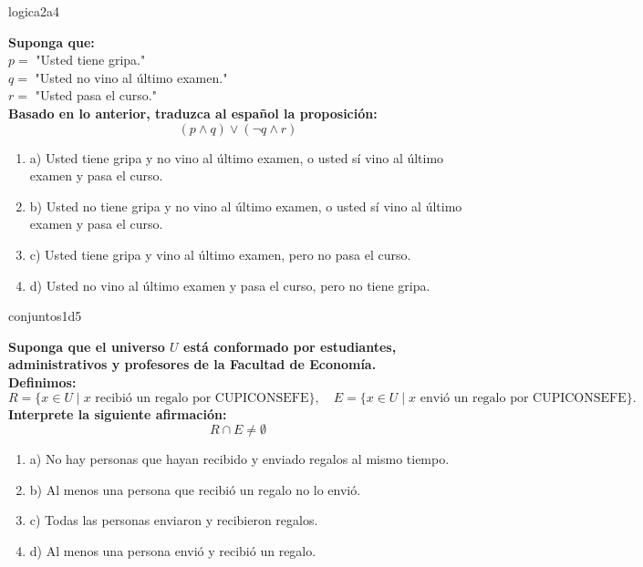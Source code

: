 \documentclass{article}
\begin{document}
\begin{question}{7}{logica}{2}{a}{4}{
\textbf{Suponga que:}\\
\(p =\) "Usted tiene gripa."\\
\(q =\) "Usted no vino al último examen."\\
\(r =\) "Usted pasa el curso."\\
\textbf{Basado en lo anterior, traduzca al español la proposición:}\\
$$
(p \land q)\lor(\neg q \land r)
$$

\begin{enumerate}
    \item a) Usted tiene gripa y no vino al último examen, o usted sí vino al último examen y pasa el curso.
    \item b) Usted no tiene gripa y no vino al último examen, o usted sí vino al último examen y pasa el curso.
    \item c) Usted tiene gripa y vino al último examen, pero no pasa el curso.
    \item d) Usted no vino al último examen y pasa el curso, pero no tiene gripa.
\end{enumerate}
}
\end{question}

\begin{question}{8}{conjuntos}{1}{d}{5}{
\textbf{Suponga que el universo \(U\) está conformado por estudiantes, administrativos y profesores de la Facultad de Economía.}\\
\textbf{Definimos:}
\[
R = \{x \in U \mid x \text{ recibió un regalo por CUPICONSEFE}\},\quad
E = \{x \in U \mid x \text{ envió un regalo por CUPICONSEFE}\}.
\]
\textbf{Interprete la siguiente afirmación:}
\[
R \cap E \neq \emptyset
\]

\begin{enumerate}
    \item a) No hay personas que hayan recibido y enviado regalos al mismo tiempo.
    \item b) Al menos una persona que recibió un regalo no lo envió.
    \item c) Todas las personas enviaron y recibieron regalos.
    \item d) Al menos una persona envió y recibió un regalo.
\end{enumerate}
}
\end{question}
\end{document}
